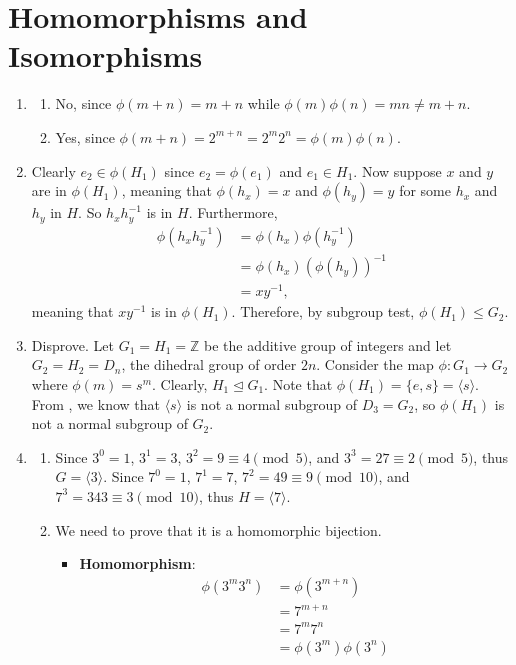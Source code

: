 \section{Homomorphisms and Isomorphisms}
\begin{enumerate}
    \item \begin{enumerate}[label=(\alph*)]
        \item No, since $\phi(m+n) = m + n$ while $\phi(m)\phi(n) = mn \neq m+n$.
        \item Yes, since $\phi(m+n) = 2^{m+n} = 2^m2^n = \phi(m)\phi(n)$.
    \end{enumerate}

    \item Clearly $e_2 \in \phi(H_1)$ since $e_2 = \phi(e_1)$ and $e_1 \in H_1$. Now suppose $x$ and $y$ are in $\phi(H_1)$, meaning that $\phi(h_x) = x$ and $\phi(h_y) = y$ for some $h_x$ and $h_y$ in $H$. So $h_xh_y^{-1}$ is in $H$. Furthermore,
    \begin{align*}
        \phi(h_xh_y^{-1}) &= \phi(h_x)\phi(h_y^{-1})\\
        &= \phi(h_x)\left(\phi(h_y)\right)^{-1}\\
        &= xy^{-1},
    \end{align*}
    meaning that $xy^{-1}$ is in $\phi(H_1)$. Therefore, by subgroup test, $\phi(H_1) \leq G_2$.

    \item Disprove. Let $G_1 = H_1 = \mathbb{Z}$ be the additive group of integers and let $G_2 = H_2 = D_n$, the dihedral group of order $2n$. Consider the map $\phi: G_1 \to G_2$ where $\phi(m) = s^m$. Clearly, $H_1 \unlhd G_1$. Note that $\phi(H_1) = \{e, s\} = \langle s \rangle$. From , we know that $\langle s \rangle$ is not a normal subgroup of $D_3 = G_2$, so $\phi(H_1)$ is not a normal subgroup of $G_2$.

    \item \begin{enumerate}[label=(\roman*)]
        \item Since $3^0 = 1$, $3^1 = 3$, $3^2 = 9 \equiv 4 \pmod{5}$, and $3^3 = 27 \equiv 2 \pmod{5}$, thus $G = \langle 3 \rangle$. Since $7^0 = 1$, $7^1 = 7$, $7^2 = 49 \equiv 9 \pmod{10}$, and $7^3 = 343 \equiv 3 \pmod{10}$, thus $H = \langle 7 \rangle$.
        \item We need to prove that it is a homomorphic bijection.
        \begin{itemize}
            \item \textbf{Homomorphism}:
            \begin{align*}
                \phi(3^m3^n) &= \phi(3^{m+n})\\
                &= 7^{m+n}\\
                &= 7^m7^n\\
                &= \phi(3^m)\phi(3^n)
            \end{align*}


\end{itemize}
\end{enumerate}
\end{enumerate}
